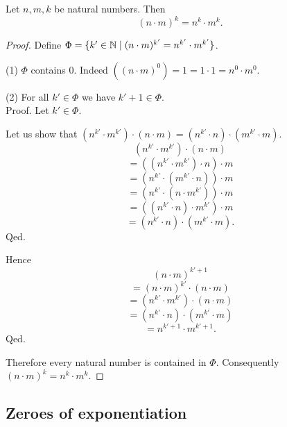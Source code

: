 \documentclass[../arithmetic.tex]{subfiles}
\begin{document}
  \begin{forthel}
    \begin{proposition}
      Let $n, m, k$ be natural numbers.
      Then \[ (n \cdot m)^{k} = n^{k} \cdot m^{k}. \]
    \end{proposition}
    \begin{proof}
      Define $\Phi = \{ k' \in \mathbb{N} \mid (n \cdot m)^{k'} =
      n^{k'} \cdot m^{k'} \}$.

      (1) $\Phi$ contains $0$.
      Indeed $((n \cdot m)^{0})
        = 1
        = 1 \cdot 1
        = n^{0} \cdot m^{0}$. %

      (2) For all $k' \in \Phi$ we have $k' + 1 \in \Phi$. \\
      Proof.
        Let $k' \in \Phi$.

        Let us show that $(n^{k'} \cdot m^{k'}) \cdot (n \cdot m) =
        (n^{k'} \cdot n) \cdot (m^{k'} \cdot m)$.
          \[  (n^{k'} \cdot m^{k'}) \cdot (n \cdot m)       \]
          \[    = ((n^{k'} \cdot m^{k'}) \cdot n) \cdot m   \]
          \[    = (n^{k'} \cdot (m^{k'} \cdot n)) \cdot m   \]
          \[    = (n^{k'} \cdot (n \cdot m^{k'})) \cdot m   \]
          \[    = ((n^{k'} \cdot n) \cdot m^{k'}) \cdot m   \]
          \[    = (n^{k'} \cdot n) \cdot (m^{k'} \cdot m).  \]
        Qed.

        Hence
        \[  (n \cdot m)^{k' + 1}                          \]
        \[    = (n \cdot m)^{k'} \cdot (n \cdot m)        \]
        \[    = (n^{k'} \cdot m^{k'}) \cdot (n \cdot m)   \]
        \[    = (n^{k'} \cdot n) \cdot (m^{k'} \cdot m)   \]
        \[    = n^{k' + 1} \cdot m^{k' + 1}.              \]
      Qed.

      Therefore every natural number is contained in $\Phi$.
      Consequently $(n \cdot m)^{k} = n^{k} \cdot m^{k}$.
    \end{proof}
  \end{forthel}


  \subsection*{Zeroes of exponentiation}
\end{document}
